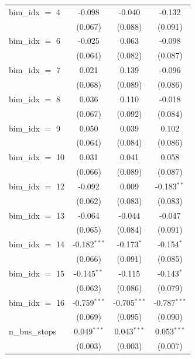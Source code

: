 \begin{tabular}{lccc}
   bim\_idx $=$ 4      & -0.098         & -0.040         & -0.132\\   
                       & (0.067)        & (0.088)        & (0.091)\\   
   bim\_idx $=$ 6      & -0.025         & 0.063          & -0.098\\   
                       & (0.064)        & (0.082)        & (0.087)\\   
   bim\_idx $=$ 7      & 0.021          & 0.139          & -0.096\\   
                       & (0.068)        & (0.089)        & (0.086)\\   
   bim\_idx $=$ 8      & 0.036          & 0.110          & -0.018\\   
                       & (0.067)        & (0.092)        & (0.084)\\   
   bim\_idx $=$ 9      & 0.050          & 0.039          & 0.102\\   
                       & (0.064)        & (0.084)        & (0.086)\\   
   bim\_idx $=$ 10     & 0.031          & 0.041          & 0.058\\   
                       & (0.066)        & (0.089)        & (0.087)\\   
   bim\_idx $=$ 12     & -0.092         & 0.009          & -0.183$^{**}$\\   
                       & (0.062)        & (0.083)        & (0.083)\\   
   bim\_idx $=$ 13     & -0.064         & -0.044         & -0.047\\   
                       & (0.065)        & (0.084)        & (0.091)\\   
   bim\_idx $=$ 14     & -0.182$^{***}$ & -0.173$^{*}$   & -0.154$^{*}$\\   
                       & (0.066)        & (0.091)        & (0.085)\\   
   bim\_idx $=$ 15     & -0.145$^{**}$  & -0.115         & -0.143$^{*}$\\   
                       & (0.062)        & (0.086)        & (0.079)\\   
   bim\_idx $=$ 16     & -0.759$^{***}$ & -0.705$^{***}$ & -0.787$^{***}$\\   
                       & (0.069)        & (0.095)        & (0.090)\\   
   n\_bus\_stops       & 0.049$^{***}$  & 0.043$^{***}$  & 0.053$^{***}$\\   
                       & (0.003)        & (0.003)        & (0.007)\\   

\end{tabular}
